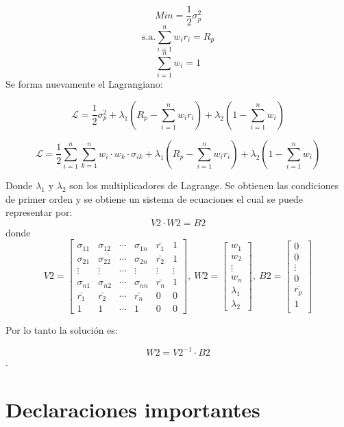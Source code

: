 \documentclass[12pt]{book} %
\begin{document}
$$Min=\frac{1}{2}\sigma_{p}^2$$
$$\text{s.a.}  \sum\limits_{i=1}^{n}w_i r_i=R_p $$
$$ \sum\limits_{i=1}^{n}w_i=1 $$
Se forma nuevamente el Lagrangiano:

$$\mathcal{L} = \frac{1}{2}\sigma_{p}^2 + \lambda_1 (R_p -\sum\limits_{i=1}^{n}w_i r_i)+\lambda_2 (1 -\sum\limits_{i=1}^{n}w_i ) $$

$$\mathcal{L} = \frac{1}{2}\sum_{i=1}^{n}\sum_{k=1}^{n}w_i\cdot w_k\cdot \sigma_{ik} + \lambda_1 (R_p -\sum\limits_{i=1}^{n}w_i r_i)+\lambda_2 (1 -\sum\limits_{i=1}^{n}w_i ) $$




Donde $\lambda_1$ y $\lambda_2$ son los multiplicadores de Lagrange.
Se obtienen las condiciones de primer orden y se obtiene un sistema de ecuaciones el cual se puede representar por:
$$V2 \cdot W2=B2$$
donde
$$
V2=\begin{bmatrix}
 \sigma_{11}&\sigma_{12}  & \cdots & \sigma_{1n} & \bar{r_1} &1 \\ 
 \sigma_{21}&\sigma_{22}  & \cdots & \sigma_{2n} & \bar{r_2} & 1 \\ 
\vdots &\vdots  & \cdots & \vdots & \vdots  & \vdots\\ 
 \sigma_{n1}&\sigma_{n2}  & \cdots & \sigma_{nn} & \bar{r_n}& 1 \\ 
\bar{r_1} & \bar{r_2} & \cdots  & \bar{r_n} & 0 & 0\\
1 & 1 & \cdots & 1 & 0 & 0
\end{bmatrix}, \ W2=\begin{bmatrix}
w_1\\ 
w_2\\ 
\vdots \\ 
w_n\\ 
\lambda_1 \\
\lambda_2
\end{bmatrix},\ B2=\begin{bmatrix}
0\\ 
0\\ 
\vdots \\ 
0\\ 
\bar{r_p}\\ 
1\\ 
\end{bmatrix}
$$

Por lo tanto la solución es:

$$W2=V2^{-1}\cdot B2$$.






\chapter{Declaraciones importantes}
\end{document}

